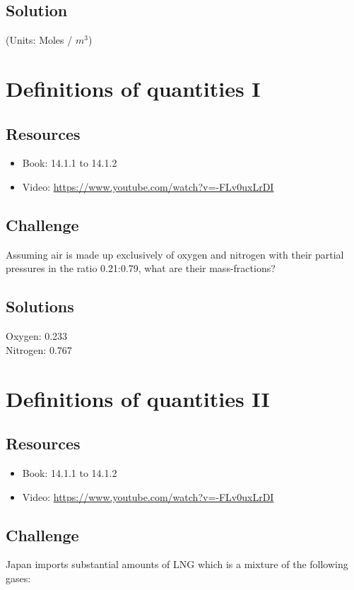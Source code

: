 \subsection*{Solution}
(Units: Moles / $m^3$)





\newpage
\section{Definitions of quantities I}

\subsection*{Resources}
\begin{itemize}
    \item Book: 14.1.1 to 14.1.2
    \item Video: \url{https://www.youtube.com/watch?v=-FLv0uxLrDI}
\end{itemize}

\subsection*{Challenge}
Assuming air is made up exclusively of oxygen and nitrogen with their partial pressures in the ratio 0.21:0.79, what are their mass-fractions?

\subsection*{Solutions}
Oxygen: 0.233 \\
Nitrogen: 0.767




\newpage
\section{Definitions of quantities II}

\subsection*{Resources}
\begin{itemize}
    \item Book: 14.1.1 to 14.1.2
    \item Video: \url{https://www.youtube.com/watch?v=-FLv0uxLrDI}
\end{itemize}

\subsection*{Challenge}
Japan imports substantial amounts of LNG which is a mixture of the following gases:

